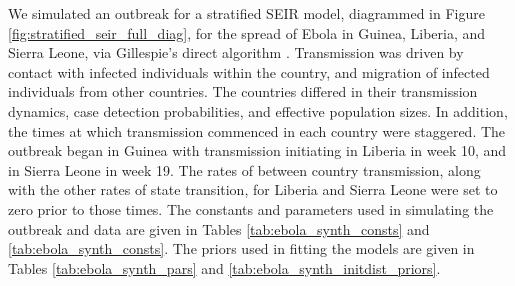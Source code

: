 We simulated an outbreak for a stratified SEIR model, diagrammed in Figure \ref{fig:stratified_seir_full_diag}, for the spread of Ebola in Guinea, Liberia, and Sierra Leone, via Gillespie's direct algorithm \cite{gillespie1976general}. Transmission was driven by contact with infected individuals within the country, and migration of infected individuals from other countries. The countries differed in their transmission dynamics, case detection probabilities, and effective population sizes. In addition, the times at which transmission commenced in each country were staggered. The outbreak began in Guinea with transmission initiating in Liberia in week 10, and in Sierra Leone in week 19. The rates of between country transmission, along with the other rates of state transition, for Liberia and Sierra Leone were set to zero prior to those times. The constants and parameters used in simulating the outbreak and data are given in Tables \ref{tab:ebola_synth_consts} and \ref{tab:ebola_synth_consts}. The priors used in fitting the models are given in Tables \ref{tab:ebola_synth_pars} and \ref{tab:ebola_synth_initdist_priors}. 

